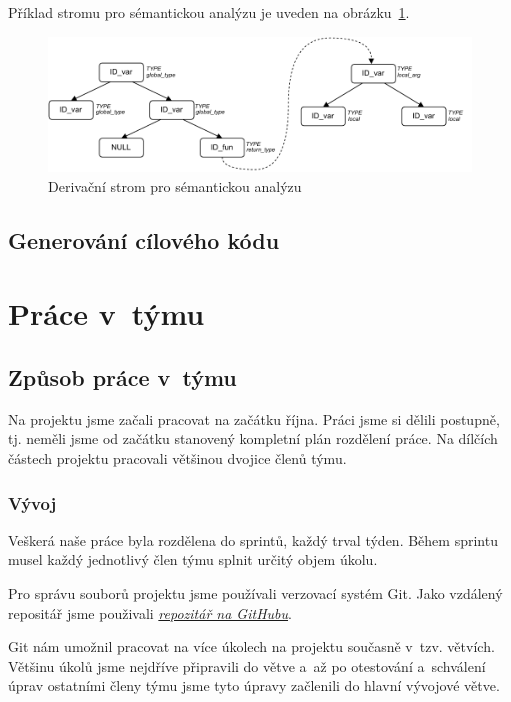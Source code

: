 \documentclass[a4paper, 11pt]{article}
\begin{document}
	Příklad stromu pro sémantickou analýzu je uveden na obrázku~\ref{figure:sem_anal_example}.

	\begin{figure}[!ht]
		\centering
		\includegraphics[width=1\linewidth]{sem_anal.pdf}
		\caption{Derivační strom pro sémantickou analýzu}
		\label{figure:sem_anal_example}
	\end{figure}


	\subsection{Generování cílového kódu}


	\section{Práce v~týmu}

	\subsection{Způsob práce v~týmu}

	Na projektu jsme začali pracovat na začátku října. Práci jsme si dělili postupně, tj. neměli jsme od začátku
	stanovený kompletní plán rozdělení práce. Na dílčích částech projektu pracovali většinou
	dvojice členů týmu.

	\subsubsection{Vývoj}

	Veškerá naše práce byla rozdělena do sprintů, každý trval týden. Během sprintu musel každý jednotlivý člen týmu
	splnit určitý objem úkolu.

	Pro správu souborů projektu jsme používali verzovací systém Git. Jako vzdálený repositář jsme použivali
	\href{https://github.com/NickSettler/ifj_proj_2022}{\textit{repozitář na GitHubu}}.

	Git nám umožnil pracovat na více úkolech na projektu současně v~tzv. větvích. Většinu úkolů jsme nejdříve
	připravili do větve a~až po otestování a~schválení úprav ostatními členy týmu jsme tyto úpravy začlenili do
	hlavní vývojové větve.
\end{document}
